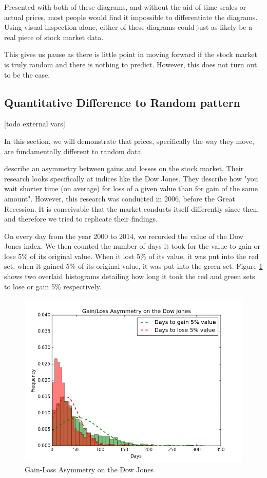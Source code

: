 \documentclass{report}
\begin{document}
Presented with both of these diagrams, and without the aid of time scales or actual prices, most people would find it impossible to differentiate the diagrams. Using visual inspection alone, either of these diagrams could just as likely be a real piece of stock market data.

This gives us pause as there is little point in moving forward if the stock market is truly random and there is nothing to predict. However, this does not turn out to be the case. 

\subsection{Quantitative Difference to Random pattern}

[todo external vars]

In this section, we will demonstrate that prices, specifically the way they move, are fundamentally different to random data.

\citet{karpio2007gain} describe an asymmetry between gains and losses on the stock market. Their research looks specifically at indices like the Dow Jones. They describe how "you wait shorter time (on average) for loss of a given value than for gain of the same amount". However, this research was conducted in 2006, before the Great Recession. It is conceivable that the market conducts itself differently since then, and therefore we tried to replicate their findings.

On every day from the year 2000 to 2014, we recorded the value of the Dow Jones index. We then counted the number of days it took for the value to gain or lose 5\% of its original value. When it lost 5\% of its value, it was put into the red set, when it gained 5\% of its original value, it was put into the green set. Figure \ref{fig:gain-loss-asymm} shows two overlaid histograms detailing how long it took the red and green sets to lose or gain 5\% respectively.

\begin{figure}[H]
	\caption{Gain-Loss Asymmetry on the Dow Jones}
	\centerline{\includegraphics[width=\textwidth]{vis/gain_loss_asymmetry.png}}
	\label{fig:gain-loss-asymm}
\end{figure}
\end{document}
